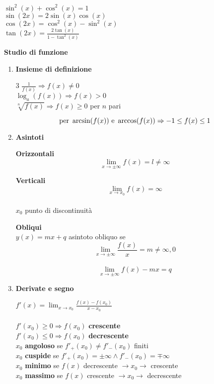 \documentclass[10pt]{article}
\begin{document}
\begin{multicols}{4}
$\sin^2(x) + \cos^2(x) = 1$\\
$\sin(2x) = 2\sin(x)\cos(x)$\\
$\cos(2x) = \cos^2(x) - \sin^2(x)$\\
$\tan(2x) = \frac{2\tan(x)}{1 - \tan^2(x)} $
\end{multicols}
\pagebreak
\maketitle
\textbf{Studio di funzione}
\begin{enumerate}
	\item \textbf{Insieme di definizione}
	\begin{multicols} {3}
		$\frac{1}{f(x)} \Rightarrow f(x) \neq 0$\\
		$\log_a(f(x)) \Rightarrow f(x) > 0$\\
		$\sqrt[n]{f(x)} \Rightarrow f(x) \geq 0$ per $n$ pari
	\end{multicols}
	$$\hbox{per }\arcsin(f(x))\hbox{ e }\arccos(f(x)) \Rightarrow -1 \leq f(x) \leq 1$$
	\item \textbf{Asintoti}
	\begin{multicols}{3}
		\textbf{Orizzontali}\\
		$$\lim_{x\to\pm\infty} f(x) = l \neq \infty$$
		\columnbreak
		
		\textbf{Verticali}\\
		$$\lim_{x\to x_0} f(x) = \infty$$\\
		$x_0$ punto di discontinuità
		\columnbreak
		
		\textbf{Obliqui}\\
		$y(x) = mx + q$ asintoto obliquo se\\
		$$\lim_{x\to\pm\infty} \frac{f(x)}{x} = m \neq \infty, 0$$\\
		$$\lim_{x\to\pm\infty} f(x) - mx = q$$
	\end{multicols}
	\item \textbf{Derivate e segno}
	\begin{multicols}{2}
		$f'(x) = \lim_{x\to x_0} \frac{f(x) - f(x_0)}{x - x_0}$\\\\
		$f'(x_0) \geq 0 \Rightarrow f(x_0)$ \textbf{crescente}\\
		$f'(x_0) \leq 0 \Rightarrow f(x_0)$ \textbf{decrescente}\\
		$x_0$ \textbf{angoloso} se $f'_+(x_0) \neq f'_-(x_0)$ finiti\\
		$x_0$ \textbf{cuspide} se $f'_+(x_0) = \pm\infty \wedge f'_-(x_0) = \mp\infty$\\
		$x_0$ \textbf{minimo} se $f(x)$ decrescente $\rightarrow x_0 \rightarrow$ crescente\\
		$x_0$ \textbf{massimo} se $f(x)$ crescente $\rightarrow x_0 \rightarrow$ decrescente\\
		\columnbreak
		

\end{multicols}
\end{enumerate}
\end{document}
